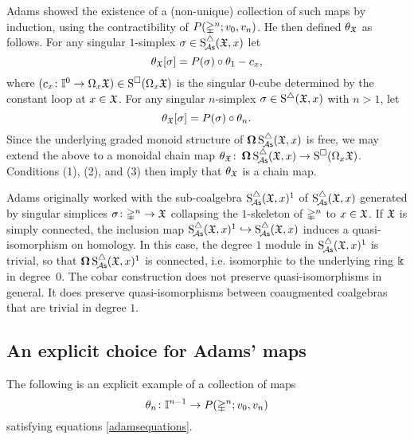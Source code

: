 Adams showed the existence of a (non-unique) collection of such maps by induction, using the contractibility of $P(\mathbb{\Delta}^n;v_0,v_n)$.
He then defined $\theta_{\mathfrak{X}}$ as follows.
For any singular $1$-simplex $\sigma \in \operatorname{S^{\triangle}_{\!{\mathcal{A}\mathsf{s}}}}(\mathfrak{X},x)$ let
\[
\theta_{\mathfrak{X}}[\sigma] = P(\sigma) \circ \theta_1 - c_x,
\]
where $(c_x \colon \mathbb{I}^0 \to \Omega_x \mathfrak{X}) \in \operatorname{S^{\square}}(\Omega_x \mathfrak{X})$ is the singular $0$-cube determined by the constant loop at $x \in \mathfrak{X}$.
For any singular $n$-simplex $\sigma \in \operatorname{S^{\triangle}}(\mathfrak{X},x)$ with $n>1$, let
\[
\theta_{\mathfrak{X}}[\sigma] = P(\sigma) \circ \theta_n.
\]
Since the underlying graded monoid structure of $\operatorname{\mathbf{\Omega}} \operatorname{S^{\triangle}_{\!{\mathcal{A}\mathsf{s}}}}(\mathfrak{X},x)$ is free, we may extend the above to a monoidal chain map $\theta_{\mathfrak{X}} \colon \operatorname{\mathbf{\Omega}} \operatorname{S^{\triangle}_{\!{\mathcal{A}\mathsf{s}}}}(\mathfrak{X},x) \to \operatorname{S^{\square}}(\Omega_x \mathfrak{X})$.
Conditions (1), (2), and (3) then imply that $\theta_{\mathfrak{X}}$ is a chain map.

\begin{remark}
	Adams originally worked with the sub-coalgebra $\operatorname{S^{\triangle}_{\!{\mathcal{A}\mathsf{s}}}}(\mathfrak{X},x)^1$ of $\operatorname{S^{\triangle}_{\!{\mathcal{A}\mathsf{s}}}}(\mathfrak{X},x)$ generated by singular simplices $\sigma \colon \mathbb{\Delta}^n \to \mathfrak{X}$ collapsing the $1$-skeleton of $\mathbb{\Delta}^n$ to $x \in \mathfrak{X}$.
	If $\mathfrak{X}$ is simply connected, the inclusion map $\operatorname{S^{\triangle}_{\!{\mathcal{A}\mathsf{s}}}}(\mathfrak{X},x)^1 \hookrightarrow \operatorname{S^{\triangle}_{\!{\mathcal{A}\mathsf{s}}}}(\mathfrak{X},x)$ induces a quasi-isomorphism on homology.
	In this case, the degree $1$ module in $\operatorname{S^{\triangle}_{\!{\mathcal{A}\mathsf{s}}}}(\mathfrak{X},x)^1$ is trivial, so that $\operatorname{\mathbf{\Omega}} \operatorname{S^{\triangle}_{\!{\mathcal{A}\mathsf{s}}}}(\mathfrak{X},x)^1$ is connected, i.e.
	isomorphic to the underlying ring $\Bbbk$ in degree~$0$.
	The cobar construction does not preserve quasi-isomorphisms in general.
	It does preserve quasi-isomorphisms between coaugmented coalgebras that are trivial in degree $1$.
\end{remark}

\subsection{An explicit choice for Adams' maps}

The following is an explicit example of a collection of maps 
\[
\theta_n \colon \mathbb{I}^{n-1} \to P(\mathbb{\Delta}^n;v_0,v_n)
\]
satisfying equations \ref{adamsequations}. 


